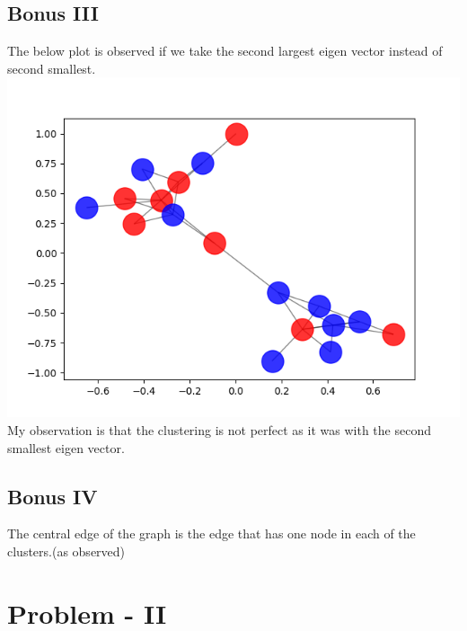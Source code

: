 \documentclass[runningheads]{llncs}
\begin{document}
\subsection{Bonus III}
The below plot is observed if we take the second largest eigen vector instead of second smallest. \\
\includegraphics[scale=0.5]{problem_1_bonus_3} \\
My observation is that the clustering is not perfect as it was with the second smallest eigen vector. 

\subsection{Bonus IV}
The central edge of the graph is the edge that has one node in each of the clusters.(as observed)
\section{Problem - II}
\end{document}

